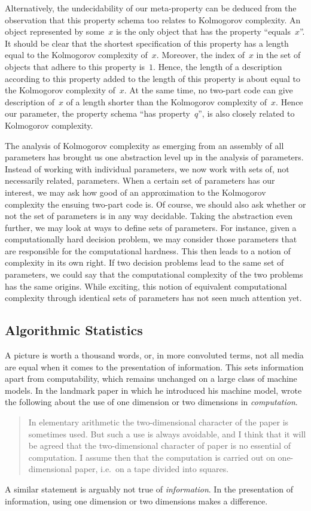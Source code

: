 Alternatively, the undecidability of our meta-property can be deduced from the observation that this property schema too relates to Kolmogorov complexity.
An object represented by some~$x$ is the only object that has the property \enquote{equals~$x$}.
It should be clear that the shortest specification of this property has a length equal to the Kolmogorov complexity of~$x$.
Moreover, the index of~$x$ in the set of objects that adhere to this property is~$1$.
Hence, the length of a description according to this property added to the length of this property is about equal to the Kolmogorov complexity of~$x$.
At the same time, no two-part code can give description of~$x$ of a length shorter than the Kolmogorov complexity of~$x$.
Hence our parameter, the property schema \enquote{has property~$q$}, is also closely related to Kolmogorov complexity.

The analysis of Kolmogorov complexity as emerging from an assembly of all parameters has brought us one abstraction level up in the analysis of parameters.
Instead of working with individual parameters, we now work with sets of, not necessarily related, parameters.
When a certain set of parameters has our interest, we may ask how good of an approximation to the Kolmogorov complexity the ensuing two-part code is.
Of course, we should also ask whether or not the set of parameters is in any way decidable.
Taking the abstraction even further, we may look at ways to define sets of parameters.
For instance, given a computationally hard decision problem, we may consider those parameters that are responsible for the computational hardness.
This then leads to a notion of complexity in its own right.
If two decision problems lead to the same set of parameters, we could say that the computational complexity of the two problems has the same origins.
While exciting, this notion of equivalent computational complexity through identical sets of parameters has not seen much attention yet.

\subsection{Algorithmic Statistics}
A picture is worth a thousand words, or, in more convoluted terms, not all media are equal when it comes to the presentation of information.
This sets information apart from computability, which remains unchanged on a large class of machine models.
In the landmark paper in which he introduced his machine model, \citeauthor{turing1937computable} wrote the following about the use of one dimension or two dimensions in \emph{computation}.
\blockcquote{turing1937computable}{
  In elementary arithmetic the two-dimensional character of the paper is sometimes used.
  But such a use is always avoidable, and I think that it will be agreed that the two-dimensional character of paper is no essential of computation.
  I assume then that the computation is carried out on one-dimensional paper, i.e.~on a tape divided into squares.
}
A similar statement is arguably not true of \emph{information}.
In the presentation of information, using one dimension or two dimensions makes a difference.

